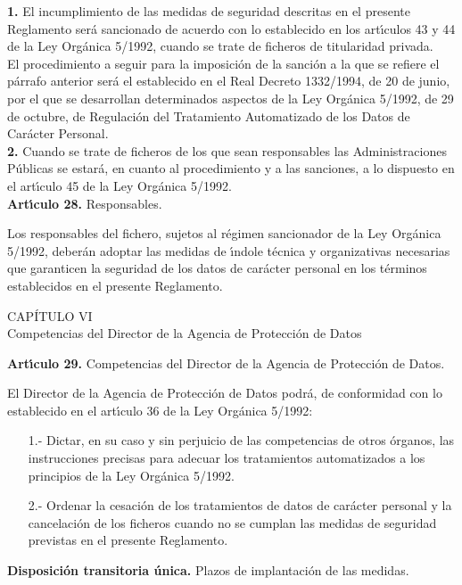 {\bf 1.} El incumplimiento de las medidas de seguridad descritas en el presente 
Reglamento ser\'a sancionado de acuerdo con lo establecido en los 
art\'{\i}culos 43 y 44 de la Ley Org\'anica 5/1992, cuando se trate de ficheros 
de titularidad privada.\\
El procedimiento a seguir para la imposici\'on de la sanci\'on a la que se 
refiere el p\'arrafo anterior ser\'a el establecido en el Real Decreto 
1332/1994, de 20 de junio, por el que se desarrollan determinados aspectos de 
la Ley Org\'anica 5/1992, de 29 de octubre, de Regulaci\'on del Tratamiento 
Automatizado de los Datos de Car\'acter Personal.\\

{\bf 2.} Cuando se trate de ficheros de los que sean responsables las 
Administraciones P\'ublicas se estar\'a, en cuanto al procedimiento y a las 
sanciones, a lo dispuesto en el art\'{\i}culo 45 de la Ley Org\'anica 5/1992.
\vspace{0.3cm}\\
{\large {\bf Art\'{\i}culo 28.} Responsables.}

Los responsables del fichero, sujetos al r\'egimen sancionador de la Ley 
Org\'anica 5/1992, deber\'an adoptar las medidas de \'{\i}ndole t\'ecnica y
organizativas necesarias que garanticen la seguridad de los datos de car\'acter 
personal en los t\'erminos establecidos en el presente Reglamento.
\begin{center}
{\LARGE CAP\'ITULO VI}\\ {\large Competencias del Director de la Agencia de
Protecci\'on de Datos}
\end{center}
\vspace{0.3cm}
{\large {\bf Art\'{\i}culo 29.} Competencias del Director de la Agencia de 
Protecci\'on de Datos.}

El Director de la Agencia de Protecci\'on de Datos podr\'a, de conformidad con 
lo establecido en el art\'{\i}culo 36 de la Ley Org\'anica 5/1992:
\begin{itemize}
\item[1.-] Dictar, en su caso y sin perjuicio de las competencias de otros 
\'organos, las instrucciones precisas para adecuar los tratamientos 
automatizados a los principios de la Ley Org\'anica 5/1992.
\item[2.-] Ordenar la cesaci\'on de los tratamientos de datos de car\'acter 
personal y la cancelaci\'on de los ficheros cuando no se cumplan las medidas de 
seguridad previstas en el presente Reglamento.
\end{itemize}
\vspace{0.3cm}
{\large {\bf Disposici\'on transitoria \'unica.} Plazos de implantaci\'on de las
medidas.}

